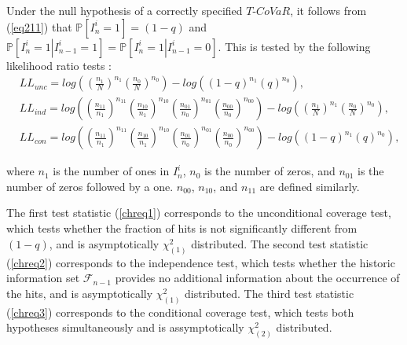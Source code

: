 \documentclass[12pt]{article}
\begin{document}
Under the null hypothesis of a correctly specified $T$-$CoVaR$, it follows from (\ref{eq211}) that $\mathbb{P}\left[I^i_n=1 \right]=(1-q)$ and $\mathbb{P}\left[I^i_n=1 \left| I^i_{n-1}=1\right.\right]=\mathbb{P}\left[I^i_n=1 \left| I^i_{n-1}=0\right.\right]$. This is tested by the following likelihood ratio tests \citep{christoffersen}:
\begin{align}
& LL_{unc}=log\left(\left(\frac{n_1}{N}\right)^{n_1} \left(\frac{n_0}{N}\right)^{n_0} \right)-log\left(\left(1-q\right)^{n_1} \left(q\right)^{n_0} \right), \label{chreq1}
\\
& LL_{ind}=log\left(\left(\frac{n_{11}}{n_1}\right)^{n_{11}}\left(\frac{n_{10}}{n_1}\right)^{n_{10}}\left(\frac{n_{01}}{n_0}\right)^{n_{01}} \left(\frac{n_{00}}{n_0}\right)^{n_{00}} \right)-log\left(\left(\frac{n_1}{N}\right)^{n_1} \left(\frac{n_0}{N}\right)^{n_0} \right), \label{chreq2}
\\
& LL_{con}=log\left(\left(\frac{n_{11}}{n_1}\right)^{n_{11}}\left(\frac{n_{10}}{n_1}\right)^{n_{10}}\left(\frac{n_{01}}{n_0}\right)^{n_{01}} \left(\frac{n_{00}}{n_0}\right)^{n_{00}} \right)-log\left(\left(1-q\right)^{n_1} \left(q\right)^{n_0} \right), \label{chreq3}
\end{align}


\noindent where $n_{1}$ is the number of ones in $I^i_n$, $n_0$ is the number of zeros, and $n_{01}$ is the number of zeros followed by a one. $n_{00}$,  $n_{10}$, and  $n_{11}$ are defined similarly.

The first test statistic (\ref{chreq1}) corresponds to the unconditional coverage test, which tests whether the fraction of hits is not significantly different from $(1-q)$, and is asymptotically $\chi^2_{(1)}$ distributed. The second test statistic (\ref{chreq2}) corresponds to the independence test, which tests whether the historic information set $\mathcal{F}_{n-1}$ provides no additional information about the occurrence of the hits, and is asymptotically $\chi^2_{(1)}$ distributed. The third test statistic (\ref{chreq3}) corresponds to the conditional coverage test, which tests both hypotheses simultaneously and is assymptotically $\chi^2_{(2)}$ distributed.


\end{document}
